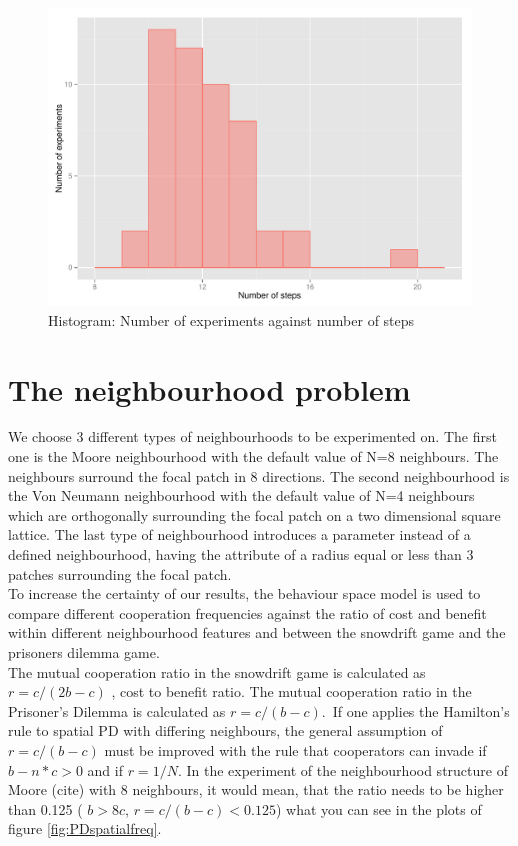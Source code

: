 \documentclass[DIV=calc, paper=a4, fontsize=11pt, twocolumn]{scrartcl}	 %
\begin{document}
\begin{figure}[here]
\centering
\begin{minipage}{.48\textwidth}
  \centering
  \includegraphics[width=1\linewidth]{task1numberofexstep}
 \caption{Histogram: Number of experiments against number of steps}
\label{fig:histo}
\end{minipage}%
\end{figure}


\section*{The neighbourhood problem}

We choose 3 different types of neighbourhoods to be experimented on. The first one is the Moore neighbourhood with the default value of N=8 neighbours. The neighbours surround the focal patch in 8 directions. The second neighbourhood is the Von Neumann neighbourhood with the default value of N=4 neighbours which are orthogonally surrounding the focal patch on a two dimensional square lattice. The last type of neighbourhood introduces a parameter instead of a defined neighbourhood, having the attribute of a radius equal or less than 3 patches surrounding the focal patch. \\
To increase the certainty of our results, the behaviour space model is used to compare different cooperation frequencies against the ratio of cost and benefit within different neighbourhood features and between the snowdrift game and the prisoners dilemma game. \\
The mutual cooperation ratio in the snowdrift game is calculated as $r = c / (2b-c)$ , cost to benefit ratio. The mutual cooperation ratio in the Prisoner's Dilemma is calculated as $r = c/ (b-c) $.\
If one applies the Hamilton's rule to spatial PD with differing neighbours, the general assumption of $r = c / (b-c) $ must be improved with the rule that cooperators can invade if $ b - n * c > 0$ and if $ r = 1/N $. In the experiment of the neighbourhood structure of Moore (cite) with 8 neighbours, it would mean, that the ratio needs to be higher than 0.125 ( $b > 8c$, $ r = c/(b-c) < 0.125$) what you can see in the plots of figure \ref{fig:PDspatialfreq}. 
\end{document}
